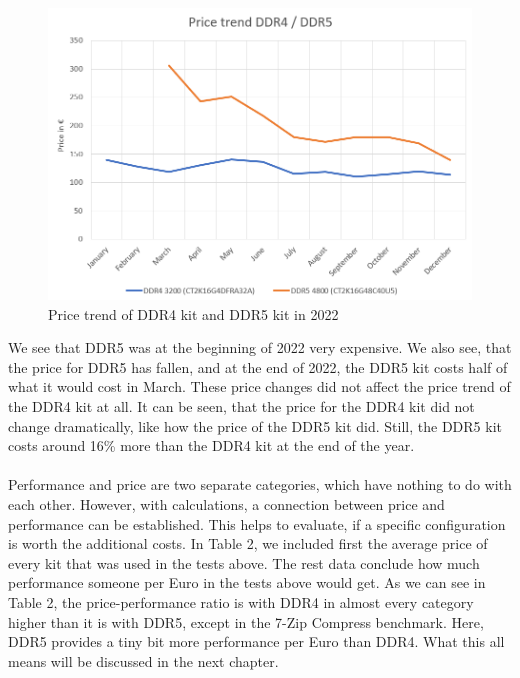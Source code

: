 \begin{figure}[H]
    \centering
    \includegraphics[width=13cm]{figures/Diagram Price Trend.png}
    \caption{Price trend of DDR4 kit and DDR5 kit in 2022 \parencite{Geizhals_ddr4, Geizhals_ddr5}}
\end{figure}

We see that DDR5 was at the beginning of 2022 very expensive. We also see, that the price for DDR5 has fallen, and at the end of 2022, the DDR5 kit costs half of what it would cost in March. These price changes did not affect the price trend of the DDR4 kit at all. It can be seen, that the price for the DDR4 kit did not change dramatically, like how the price of the DDR5 kit did. Still, the DDR5 kit costs around 16\% more than the DDR4 kit at the end of the year.
\\
\\
Performance and price are two separate categories, which have nothing to do with each other. However, with calculations, a connection between price and performance can be established. This helps to evaluate, if a specific configuration is worth the additional costs. In Table 2, we included first the average price of every kit that was used in the tests above. The rest data conclude how much performance someone per Euro in the tests above would get. As we can see in Table 2, the price-performance ratio is with DDR4 in almost every category higher than it is with DDR5, except in the 7-Zip Compress benchmark. Here, DDR5 provides a tiny bit more performance per Euro than DDR4. What this all means will be discussed in the next chapter. 

